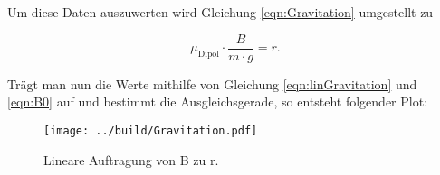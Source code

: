 Um diese Daten auszuwerten wird Gleichung \eqref{eqn:Gravitation} umgestellt zu

\begin{equation}
    \mu_\text{Dipol} \cdot \frac{B}{m \cdot g} =  r .
    \label{eqn:linGravitation}
\end{equation}

\noindent
Trägt man nun die Werte mithilfe von Gleichung \eqref{eqn:linGravitation}  und \eqref{eqn:B0} auf und bestimmt die Ausgleichsgerade, so entsteht folgender Plot:

\begin{figure}
    \texttt{[image: ../build/Gravitation.pdf]}
    \caption{Lineare Auftragung von B zu r.}  
\end{figure}


